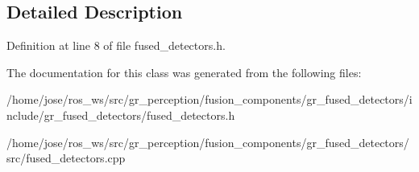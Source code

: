 \subsection{Detailed Description}


Definition at line 8 of file fused\+\_\+detectors.\+h.



The documentation for this class was generated from the following files\+:\begin{DoxyCompactItemize}
\item 
/home/jose/ros\+\_\+ws/src/gr\+\_\+perception/fusion\+\_\+components/gr\+\_\+fused\+\_\+detectors/include/gr\+\_\+fused\+\_\+detectors/fused\+\_\+detectors.\+h\item 
/home/jose/ros\+\_\+ws/src/gr\+\_\+perception/fusion\+\_\+components/gr\+\_\+fused\+\_\+detectors/src/fused\+\_\+detectors.\+cpp\end{DoxyCompactItemize}
